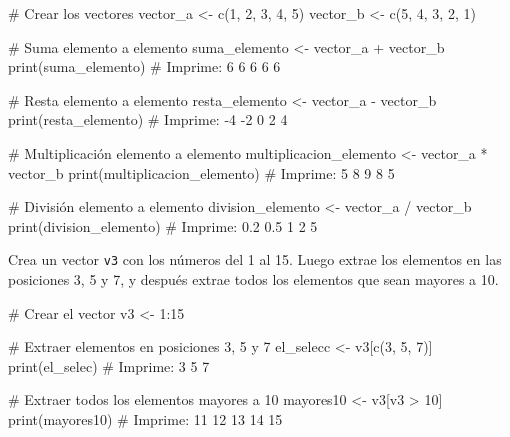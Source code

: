 \documentclass[
  letterpaper,
  DIV=11,
  numbers=noendperiod]{scrreprt}
\newenvironment{Shaded}{\begin{snugshade}}{\end{snugshade}}
\newcommand{\CommentTok}[1]{\textcolor[rgb]{0.37,0.37,0.37}{#1}}
\newcommand{\DecValTok}[1]{\textcolor[rgb]{0.68,0.00,0.00}{#1}}
\newcommand{\FunctionTok}[1]{\textcolor[rgb]{0.28,0.35,0.67}{#1}}
\newcommand{\NormalTok}[1]{\textcolor[rgb]{0.00,0.23,0.31}{#1}}
\newcommand{\OtherTok}[1]{\textcolor[rgb]{0.00,0.23,0.31}{#1}}
\newcommand{\SpecialCharTok}[1]{\textcolor[rgb]{0.37,0.37,0.37}{#1}}
\begin{document}
\begin{Shaded}
\begin{Highlighting}[]
\CommentTok{\# Crear los vectores}
\NormalTok{vector\_a }\OtherTok{\textless{}{-}} \FunctionTok{c}\NormalTok{(}\DecValTok{1}\NormalTok{, }\DecValTok{2}\NormalTok{, }\DecValTok{3}\NormalTok{, }\DecValTok{4}\NormalTok{, }\DecValTok{5}\NormalTok{)}
\NormalTok{vector\_b }\OtherTok{\textless{}{-}} \FunctionTok{c}\NormalTok{(}\DecValTok{5}\NormalTok{, }\DecValTok{4}\NormalTok{, }\DecValTok{3}\NormalTok{, }\DecValTok{2}\NormalTok{, }\DecValTok{1}\NormalTok{)}

\CommentTok{\# Suma elemento a elemento}
\NormalTok{suma\_elemento }\OtherTok{\textless{}{-}}\NormalTok{ vector\_a }\SpecialCharTok{+}\NormalTok{ vector\_b}
\FunctionTok{print}\NormalTok{(suma\_elemento)  }\CommentTok{\# Imprime: 6 6 6 6 6}

\CommentTok{\# Resta elemento a elemento}
\NormalTok{resta\_elemento }\OtherTok{\textless{}{-}}\NormalTok{ vector\_a }\SpecialCharTok{{-}}\NormalTok{ vector\_b}
\FunctionTok{print}\NormalTok{(resta\_elemento)  }\CommentTok{\# Imprime: {-}4 {-}2 0 2 4}

\CommentTok{\# Multiplicación elemento a elemento}
\NormalTok{multiplicacion\_elemento }\OtherTok{\textless{}{-}}\NormalTok{ vector\_a }\SpecialCharTok{*}\NormalTok{ vector\_b}
\FunctionTok{print}\NormalTok{(multiplicacion\_elemento)  }\CommentTok{\# Imprime: 5 8 9 8 5}

\CommentTok{\# División elemento a elemento}
\NormalTok{division\_elemento }\OtherTok{\textless{}{-}}\NormalTok{ vector\_a }\SpecialCharTok{/}\NormalTok{ vector\_b}
\FunctionTok{print}\NormalTok{(division\_elemento)  }\CommentTok{\# Imprime: 0.2 0.5 1 2 5}
\end{Highlighting}
\end{Shaded}

Crea un vector \texttt{v3} con los números del 1 al 15. Luego extrae los
elementos en las posiciones 3, 5 y 7, y después extrae todos los
elementos que sean mayores a 10.

\begin{Shaded}
\begin{Highlighting}[]
\CommentTok{\# Crear el vector}
\NormalTok{v3 }\OtherTok{\textless{}{-}} \DecValTok{1}\SpecialCharTok{:}\DecValTok{15}

\CommentTok{\# Extraer elementos en posiciones 3, 5 y 7}
\NormalTok{el\_selecc }\OtherTok{\textless{}{-}}\NormalTok{ v3[}\FunctionTok{c}\NormalTok{(}\DecValTok{3}\NormalTok{, }\DecValTok{5}\NormalTok{, }\DecValTok{7}\NormalTok{)]}
\FunctionTok{print}\NormalTok{(el\_selec)  }\CommentTok{\# Imprime: 3 5 7}

\CommentTok{\# Extraer todos los elementos mayores a 10}
\NormalTok{mayores10 }\OtherTok{\textless{}{-}}\NormalTok{ v3[v3 }\SpecialCharTok{\textgreater{}} \DecValTok{10}\NormalTok{]}
\FunctionTok{print}\NormalTok{(mayores10)  }\CommentTok{\# Imprime: 11 12 13 14 15}
\end{Highlighting}
\end{Shaded}
\end{document}
